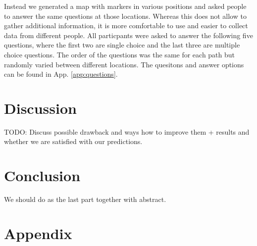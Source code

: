 \documentclass[letterpaper]{article}
\begin{document}
Instead we generated a map with markers in various positions and asked people to answer the same questions at those locations. Whereas this does not allow to gather additional information, it is more comfortable to use and easier to collect data from different people. All particpants were asked to answer the following five questions, where the first two are single choice and the last three are multiple choice questions. The order of the questions was the same for each path but randomly varied between different locations. The quesitons and answer options can be found in App. \ref{app:questions}.



\section{Discussion}\label{sec:discussion}
TODO: Discuss possible drawback and ways how to improve them + results and whether we are satisfied with our predictions.

\section{Conclusion}
We should do as the last part together with abstract.




\section{Appendix}
\end{document}
